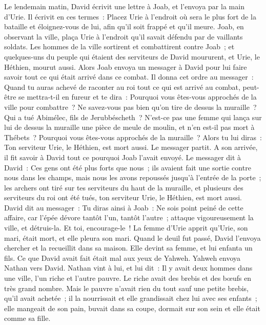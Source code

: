 \begin{multicols}{2}
Le lendemain matin, David écrivit une lettre à Joab, et l'envoya par la main d'Urie.
Il écrivit en ces termes~: Placez Urie à l'endroit où sera le plus fort de la bataille et éloignez-vous de lui, afin qu'il soit frappé et qu'il meure.
Joab, en observant la ville, plaça Urie à l'endroit qu'il savait défendu par de vaillants soldats.
Les hommes de la ville sortirent et combattirent contre Joab~; et quelques-uns du peuple qui étaient des serviteurs de David moururent, et Urie, le Héthien, mourut aussi.
Alors Joab envoya un messager à David pour lui faire savoir tout ce qui était arrivé dans ce combat.
Il donna cet ordre au messager~: Quand tu auras achevé de raconter au roi tout ce qui est arrivé au combat,
peut-être se mettra-t-il en fureur et te dira~: Pourquoi vous êtes-vous approchés de la ville pour combattre~? Ne savez-vous pas bien qu'on tire de dessus la muraille~?
Qui a tué Abimélec, fils de Jerubbéscheth~? N'est-ce pas une femme qui lança sur lui de dessus la muraille une pièce de meule de moulin, et n'en est-il pas mort à Thébets~? Pourquoi vous êtes-vous approchés de la muraille~? Alors tu lui diras~: Ton serviteur Urie, le Héthien, est mort aussi.
Le messager partit. A son arrivée, il fit savoir à David tout ce pourquoi Joab l'avait envoyé.
Le messager dit à David~: Ces gens ont été plus forts que nous~; ils avaient fait une sortie contre nous dans les champs, mais nous les avons repoussés jusqu'à l'entrée de la porte~;
les archers ont tiré sur tes serviteurs du haut de la muraille, et plusieurs des serviteurs du roi ont été tués, ton serviteur Urie, le Héthien, est mort aussi.
David dit au messager~: Tu diras ainsi à Joab~: Ne sois point peiné de cette affaire, car l'épée dévore tantôt l'un, tantôt l'autre~; attaque vigoureusement la ville, et détruis-la. Et toi, encourage-le~!
La femme d'Urie apprit qu'Urie, son mari, était mort, et elle pleura son mari.
Quand le deuil fut passé, David l'envoya chercher et la recueillit dans sa maison. Elle devint sa femme, et lui enfanta un fils. Ce que David avait fait était mal aux yeux de Yahweh.
\VerseOne{}Yahweh envoya Nathan vers David. Nathan vint à lui, et lui dit~: Il y avait deux hommes dans une ville, l'un riche et l'autre pauvre.
Le riche avait des brebis et des bœufs en très grand nombre.
Mais le pauvre n'avait rien du tout sauf une petite brebis, qu'il avait achetée~; il la nourrissait et elle grandissait chez lui avec ses enfants~; elle mangeait de son pain, buvait dans sa coupe, dormait sur son sein et elle était comme sa fille.

\end{multicols}
